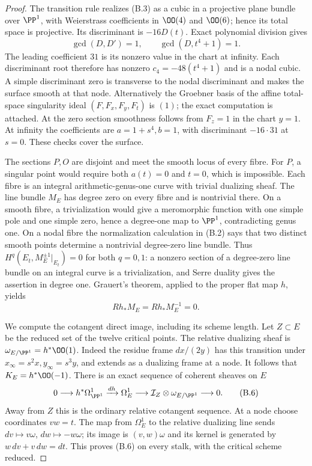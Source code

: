 \begin{proof}
The transition rule realizes (B.3) as a cubic in a projective plane bundle over $\PP^1$, with Weierstrass coefficients in $\OO(4)$ and $\OO(6)$; hence its total space is projective. Its discriminant is $-16D(t)$. Exact polynomial division gives
\[
 \gcd(D,D')=1,\qquad \gcd(D,t^4+1)=1.
\]
The leading coefficient $31$ is its nonzero value in the chart at infinity. Each discriminant root therefore has nonzero $c_4=-48(t^4+1)$ and is a nodal cubic. A simple discriminant zero is transverse to the nodal discriminant and makes the surface smooth at that node. Alternatively the Groebner basis of the affine total-space singularity ideal $(F,F_x,F_y,F_t)$ is $(1)$; the exact computation is attached. At the zero section smoothness follows from $F_z=1$ in the chart $y=1$. At infinity the coefficients are $a=1+s^4,b=1$, with discriminant $-16\cdot31$ at $s=0$. These checks cover the surface.

The sections $P,O$ are disjoint and meet the smooth locus of every fibre. For $P$, a singular point would require both $a(t)=0$ and $t=0$, which is impossible. Each fibre is an integral arithmetic-genus-one curve with trivial dualizing sheaf. The line bundle $M_E$ has degree zero on every fibre and is nontrivial there. On a smooth fibre, a trivialization would give a meromorphic function with one simple pole and one simple zero, hence a degree-one map to $\PP^1$, contradicting genus one. On a nodal fibre the normalization calculation in (B.2) says that two distinct smooth points determine a nontrivial degree-zero line bundle. Thus $H^q(E_t,M_E^{\pm1}|_{E_t})=0$ for both $q=0,1$: a nonzero section of a degree-zero line bundle on an integral curve is a trivialization, and Serre duality gives the assertion in degree one. Grauert's theorem, applied to the proper flat map $h$, yields
\[
 Rh_*M_E=Rh_*M_E^{-1}=0.                               \tag{B.5}
\]

We compute the cotangent direct image, including its scheme length. Let $Z\subset E$ be the reduced set of the twelve critical points. The relative dualizing sheaf is $\omega_{E/\PP^1}=h^*\OO(1)$. Indeed the residue frame $dx/(2y)$ has this transition under $x_\infty=s^2x,y_\infty=s^3y$, and extends as a dualizing frame at a node. It follows that $K_E=h^*\OO(-1)$. There is an exact sequence of coherent sheaves on $E$
\[
0\longrightarrow h^*\Omega^1_{\PP^1}
 \xrightarrow{dh}\Omega^1_E
 \longrightarrow\mathcal I_Z\otimes\omega_{E/\PP^1}
 \longrightarrow0.                                   \tag{B.6}
\]
Away from $Z$ this is the ordinary relative cotangent sequence. At a node choose coordinates $vw=t$. The map from $\Omega^1_E$ to the relative dualizing line sends $dv\mapsto v\omega$, $dw\mapsto-w\omega$; its image is $(v,w)\omega$ and its kernel is generated by $w\,dv+v\,dw=dt$. This proves (B.6) on every stalk, with the critical scheme reduced.


\end{proof}
